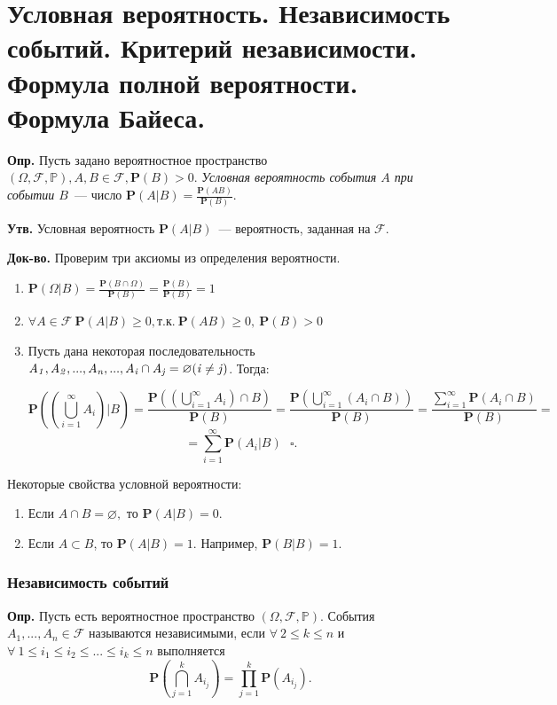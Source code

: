 \documentclass[oneside,final,14pt]{extreport}
\newcommand\mydef{{\bf Опр.}}
\newcommand\myst{{\bf Утв.}}
\newcommand\myqed{{\bf Док-во.}}
\newcommand\myprob[1]{{\mathbf{P}(#1)}}
\theoremstyle{definition}
\begin{document}
\section {Условная вероятность. Независимость событий. Критерий независимости. Формула полной вероятности. Формула Байеса.}

\mydef{} Пусть задано вероятностное пространство \( (\Omega, \mathcal{F}, \mathbb{P}), A, B \in \mathcal{F}, \myprob{B} > 0 \). {\it Условная вероятность события \( A \) при событии \(B\)}~--- число \( \myprob{A|B}=\frac{\myprob{AB}}{\myprob{B}} \).

\myst{} Условная вероятность \( \myprob{A|B} \)~--- вероятность, заданная на \( \mathcal{F} \).

\myqed{} Проверим три аксиомы из определения вероятности.

\begin{enumerate}
    \item  \( \myprob{\Omega|B} = \frac{\myprob{B \cap \Omega}}{\myprob{B}} = \frac{\myprob{B}}{\myprob{B}} = 1\)
    \item \( \forall A \in \mathcal{F}~ \myprob{A|B} \geq 0, \text{т.к.}~ \myprob{AB} \geqslant 0,~ \myprob{B} > 0 \)
    \item Пусть дана некоторая последовательность $\it A_1, A_2, ..., A_n, ..., A_i \cap A_j = \varnothing ({\it i \ne j})$. Тогда: 
    
    $$\myprob{(\bigcup\limits_{i=1}^\infty A_i)|B}  = \dfrac{\myprob{(\bigcup\limits_{i=1}^\infty A_i) \cap B}}{\myprob{B}} = \dfrac{\myprob{\bigcup\limits_{i=1}^\infty(A_i \cap B)}}{\myprob{B}} = \dfrac{\sum\limits_{i=1}^\infty \myprob{A_i \cap B}}{\myprob{B}} = $$$$ = \sum\limits_{i=1}^\infty \myprob{A_i | B} ~~~ \square. $$
    
\end{enumerate}

Некоторые свойства условной вероятности:
\begin{enumerate}
    \item Если $A \cap B = \varnothing,$ то $\myprob {A | B} = 0.$
    \item Если $A \subset B$, то $\myprob{A|B} = 1.$ Например, $\myprob{B|B} = 1.$
\end{enumerate}

\newpage

\subsubsection{Независимость событий}
\mydef{} Пусть есть вероятностное пространство $(\Omega, \mathcal{F}, \mathbb{P})$. События $A_1, ..., A_n \in \mathcal{F}$ называются независимыми, если $\forall~2 \leq k \leq n$ и $\forall~1 \leq i_1 \leq i_2 \leq ... \leq i_k \leq n$ выполняется 
$$ \myprob {\bigcap\limits_{j=1}^k A_{i_j}} = \prod\limits_{j=1}^k \myprob{A_{i_j}}. $$
\end{document}
